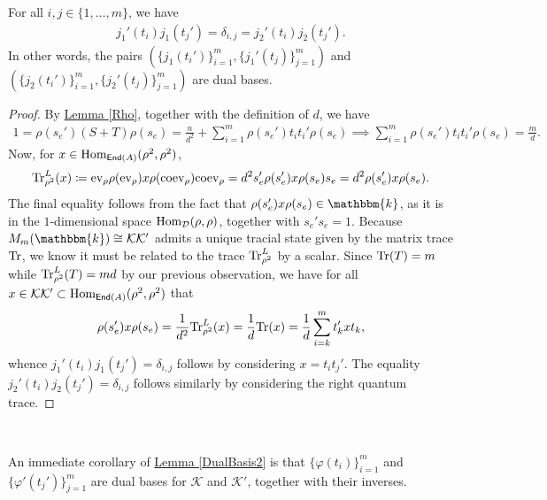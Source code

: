 \noindent\begin{lemma}\label{DualBasis2} For all $i, j \in \{1, \dots, m\}$, we have
\begin{align}
j_1'(t_i)j_1(t_j') = \delta_{i,j} = j_2'(t_i)j_2(t_j').\label{DualBasisIdentity}
\end{align}
\noindent In other words, the pairs $(\{j_1(t_i')\}_{i=1}^m, \{j_1'(t_j)\}_{j=1}^m)$ and $(\{j_2(t_i')\}_{i=1}^m, \{j_2'(t_j)\}_{j=1}^m)$ are dual bases.\\
\end{lemma}

\noindent\begin{proof} By \hyperref[Rho]{Lemma \ref*{Rho}}, together with the definition of ${d}$, we have
\begin{align*}
1 = \rho(s_e')(S + T)\rho(s_e) = \frac{n}{{d}^2} + \sum_{i=1}^m \rho(s_e')t_it_i'\rho(s_e) \implies \sum_{i=1}^m \rho(s_e')t_it_i'\rho(s_e) = \frac{m}{{d}}.
\end{align*}
\noindent Now, for $x \in \textup{Hom}_{\textup{\textsf{End}}(A)}(\rho^2, \rho^2)$,
\begin{align*}
\textup{Tr}^L_{\rho^2}(x) \coloneqq \textup{ev}_\rho\rho(\textup{ev}_\rho)x\rho(\textup{coev}_\rho)\textup{coev}_\rho = {d}^2 s_e'\rho(s_e')x\rho(s_e)s_e =  {d}^2 \rho(s_e')x\rho(s_e).
\end{align*}
\noindent The final equality follows from the fact that $\rho(s_e')x\rho(s_e) \in \mathbbm{k}$, as it is in the $1$-dimensional space $\textup{Hom}_\mathcal{D}(\rho, \rho)$, together with $s_e's_e = 1$. Because $M_m(\mathbbm{k}) \cong \mathcal{K}\mathcal{K}'$ admits a unique tracial state given by the matrix trace $\textup{Tr}$, we know it must be related to the trace $\textup{Tr}^L_{\rho^2}$ by a scalar. Since $\textup{Tr}(T) = m$ while $\textup{Tr}^L_{\rho^2}(T) = md$ by our previous observation, we have for all $x \in \mathcal{K}\mathcal{K}' \subset \textup{Hom}_{\textup{\textsf{End}}(A)}(\rho^2, \rho^2)$ that
\begin{align*}
\rho(s_e')x\rho(s_e) = \frac{1}{{d}^2}\textup{Tr}^L_{\rho^2}(x) = \frac{1}{{d}}\textup{Tr}(x) = \frac{1}{{d}}\sum_{i=k}^m t_k'xt_k,
\end{align*}
\noindent whence $j_1'(t_i)j_1(t_j') = \delta_{i,j}$ follows by considering $x = t_it_j'$. The equality $j_2'(t_i)j_2(t_j') = \delta_{i,j}$ follows similarly by considering the right quantum trace. %
\end{proof}\\

\noindent\begin{remark}\label{PhiDualBasis} An immediate corollary of \hyperref[DualBasis2]{Lemma \ref*{DualBasis2}} is that $\{\varphi(t_i)\}_{i=1}^m$ and $\{\varphi'(t_j')\}_{j=1}^m$ are dual bases for $\mathcal{K}$ and $\mathcal{K}'$, together with their inverses.\\
\end{remark}

